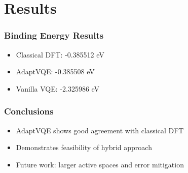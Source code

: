 \section{Results}

\begin{frame}
\frametitle{Binding Energy Results}
\begin{itemize}
    \item Classical DFT: -0.385512 eV
    \item AdaptVQE: -0.385508 eV
    \item Vanilla VQE: -2.325986 eV
\end{itemize}
\end{frame}

\begin{frame}
\frametitle{Conclusions}
\begin{itemize}
    \item AdaptVQE shows good agreement with classical DFT
    \item Demonstrates feasibility of hybrid approach
    \item Future work: larger active spaces and error mitigation
\end{itemize}
\end{frame} 